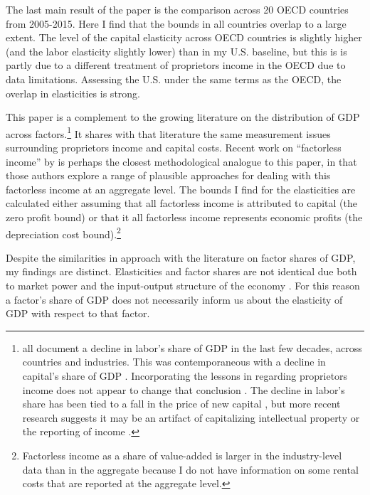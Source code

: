 \documentclass[11pt]{article}
\begin{document}
The last main result of the paper is the comparison across 20 OECD countries from 2005-2015. Here I find that the bounds in all countries overlap to a large extent. The level of the capital elasticity across OECD countries is slightly higher (and the labor elasticity slightly lower) than in my U.S. baseline, but this is is partly due to a different treatment of proprietors income in the OECD due to data limitations. Assessing the U.S. under the same terms as the OECD, the overlap in elasticities is strong. 

This paper is a complement to the growing literature on the distribution of GDP across factors.\footnote{\cite{azmat2012,bentolilaSP2003,estrada2014,harrison2005,jt2007,guscina2006,kn2014,daoetal2017} all document a decline in labor's share of GDP in the last few decades, across countries and industries. This was contemporaneous with a decline in capital's share of GDP \citep{Barkai000,rognlie2015}. Incorporating the lessons in \cite{Gollin:2002zr} regarding proprietors income does not appear to change that conclusion \citep{gommerupert2004,elsbyhs2013}. The decline in labor's share has been tied to a fall in the price of new capital \citep{kn2014}, but more recent research suggests it may be an artifact of capitalizing intellectual property \citep{ksz2020} or the reporting of income \citep{RePEc:oup:qjecon:v:134:y:2019:i:4:p:1675-1745.}.} It shares with that literature the same measurement issues surrounding proprietors income and capital costs. Recent work on ``factorless income'' by \cite{kn2019} is perhaps the closest methodological analogue to this paper, in that those authors explore a range of plausible approaches for dealing with this factorless income at an aggregate level. The bounds I find for the elasticities are calculated either assuming that all factorless income is attributed to capital (the zero profit bound) or that it all factorless income represents economic profits (the depreciation cost bound).\footnote{Factorless income as a share of value-added is larger in the industry-level data than in the aggregate because I do not have information on some rental costs that are reported at the aggregate level.} 

Despite the similarities in approach with the literature on factor shares of GDP, my findings are distinct. Elasticities and factor shares are not identical due both to market power and the input-output structure of the economy \citep{bfshortnote,bfprodge}. For this reason a factor's share of GDP does not necessarily inform us about the elasticity of GDP with respect to that factor.
\end{document}
